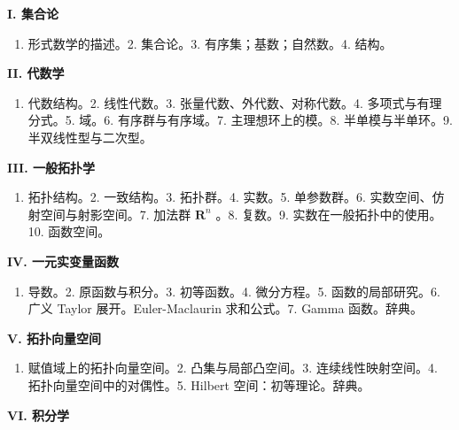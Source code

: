
\textbf{I. 集合论}\par

\begin{enumerate}
\def\labelenumi{\arabic{enumi}.}
\tightlist
\item
  形式数学的描述。2. 集合论。3. 有序集；基数；自然数。4. 结构。
\end{enumerate}

\textbf{II. 代数学}\par

\begin{enumerate}
\def\labelenumi{\arabic{enumi}.}
\tightlist
\item
  代数结构。2. 线性代数。3. 张量代数、外代数、对称代数。4. 多项式与有理分式。5. 域。6. 有序群与有序域。7. 主理想环上的模。8. 半单模与半单环。9. 半双线性型与二次型。
\end{enumerate}

\textbf{III. 一般拓扑学}\par

\begin{enumerate}
\def\labelenumi{\arabic{enumi}.}
\tightlist
\item
  拓扑结构。2. 一致结构。3. 拓扑群。4. 实数。5. 单参数群。6. 实数空间、仿射空间与射影空间。7. 加法群 \(\mathbf{R}^n\) 。8. 复数。9. 实数在一般拓扑中的使用。10. 函数空间。
\end{enumerate}

\textbf{IV. 一元实变量函数}\par

\begin{enumerate}
\def\labelenumi{\arabic{enumi}.}
\tightlist
\item
  导数。2. 原函数与积分。3. 初等函数。4. 微分方程。5. 函数的局部研究。6. 广义 Taylor 展开。Euler-Maclaurin 求和公式。7. Gamma 函数。辞典。
\end{enumerate}

\textbf{V. 拓扑向量空间}\par

\begin{enumerate}
\def\labelenumi{\arabic{enumi}.}
\tightlist
\item
  赋值域上的拓扑向量空间。2. 凸集与局部凸空间。3. 连续线性映射空间。4. 拓扑向量空间中的对偶性。5. Hilbert 空间：初等理论。辞典。
\end{enumerate}

\textbf{VI. 积分学}\par

